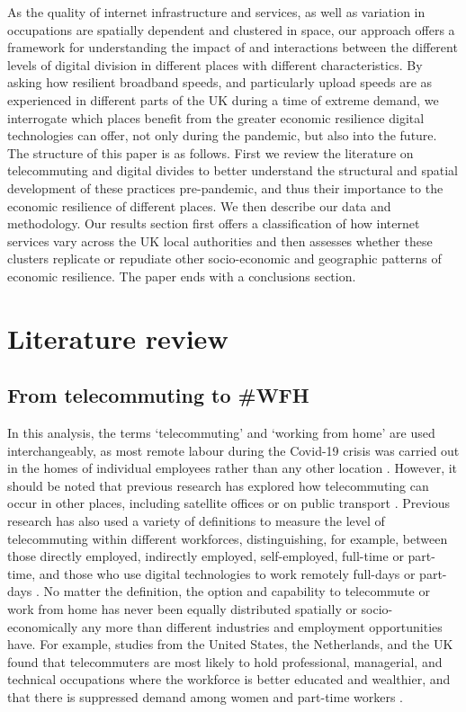 \documentclass[Royal,times,sageh]{sagej}
\begin{document}
As the quality of internet infrastructure and services, as well as
variation in occupations are spatially dependent and clustered in space,
our approach offers a framework for understanding the impact of and
interactions between the different levels of digital division in
different places with different characteristics. By asking how resilient
broadband speeds, and particularly upload speeds are as experienced in
different parts of the UK during a time of extreme demand, we
interrogate which places benefit from the greater economic resilience
digital technologies can offer, not only during the pandemic, but also
into the future. The structure of this paper is as follows. First we
review the literature on telecommuting and digital divides to better
understand the structural and spatial development of these practices
pre-pandemic, and thus their importance to the economic resilience of
different places. We then describe our data and methodology. Our results
section first offers a classification of how internet services vary
across the UK local authorities and then assesses whether these clusters
replicate or repudiate other socio-economic and geographic patterns of
economic resilience. The paper ends with a conclusions section.

\hypertarget{sec:2}{%
\section{Literature review}\label{sec:2}}

\hypertarget{sec:2.1}{%
\subsection{From telecommuting to \#WFH}\label{sec:2.1}}

In this analysis, the terms `telecommuting' and `working from home' are
used interchangeably, as most remote labour during the Covid-19 crisis
was carried out in the homes of individual employees rather than any
other location \citep{eurofound2020}. However, it should be noted that
previous research has explored how telecommuting can occur in other
places, including satellite offices or on public transport
\citep{felstead2012rapid, siha2006telecommuting}. Previous research has
also used a variety of definitions to measure the level of telecommuting
within different workforces, distinguishing, for example, between those
directly employed, indirectly employed, self-employed, full-time or
part-time, and those who use digital technologies to work remotely
full-days or part-days
\citep{allen2015effective, bailey2002review, haddad2009examination}. No
matter the definition, the option and capability to telecommute or work
from home has never been equally distributed spatially or
socio-economically any more than different industries and employment
opportunities have. For example, studies from the United States, the
Netherlands, and the UK found that telecommuters are most likely to hold
professional, managerial, and technical occupations where the workforce
is better educated and wealthier, and that there is suppressed demand
among women and part-time workers
\citep{headicar2016move, peters2004employees, singh2013modeling}.
\end{document}
